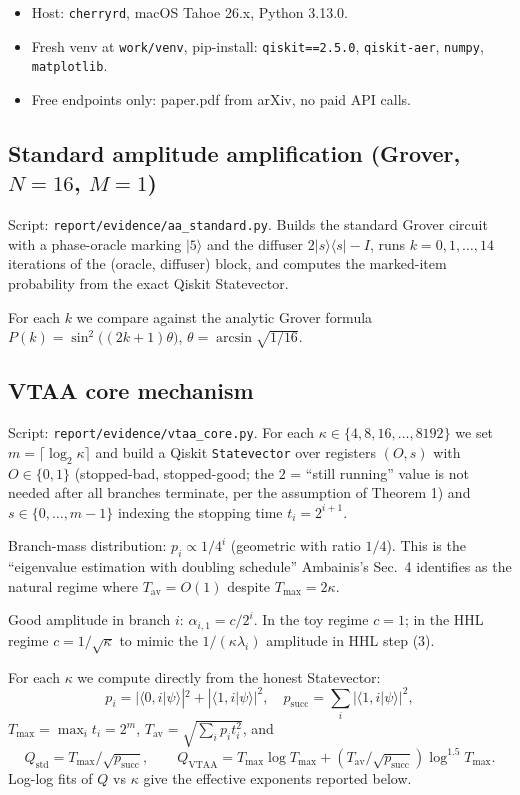 \documentclass[11pt]{article}
\begin{document}
\begin{itemize}
\item Host: \texttt{cherryrd}, macOS Tahoe 26.x, Python 3.13.0.
\item Fresh venv at \texttt{work/venv}, pip-install: \texttt{qiskit==2.5.0},
      \texttt{qiskit-aer}, \texttt{numpy}, \texttt{matplotlib}.
\item Free endpoints only: paper.pdf from arXiv, no paid API calls.
\end{itemize}

\subsection{Standard amplitude amplification (Grover, $N = 16$, $M = 1$)}

Script: \texttt{report/evidence/aa\_standard.py}. Builds the standard Grover
circuit with a phase-oracle marking $|5\rangle$ and the diffuser $2|s\rangle\langle s| - I$,
runs $k = 0, 1, \ldots, 14$ iterations of the (oracle, diffuser) block,
and computes the marked-item probability from the exact Qiskit Statevector.

For each $k$ we compare against the analytic Grover formula
$P(k) = \sin^2\!\bigl((2k+1)\theta\bigr)$, $\theta = \arcsin\sqrt{1/16}$.

\subsection{VTAA core mechanism}

Script: \texttt{report/evidence/vtaa\_core.py}. For each
$\kappa \in \{4, 8, 16, \ldots, 8192\}$ we set $m = \lceil\log_2\kappa\rceil$
and build a Qiskit \texttt{Statevector} over registers
$(O, s)$ with $O \in \{0, 1\}$ (stopped-bad, stopped-good; the $2$ = ``still
running'' value is not needed after all branches terminate, per the assumption
of Theorem 1) and $s \in \{0, \ldots, m-1\}$ indexing the stopping time
$t_i = 2^{i+1}$.

Branch-mass distribution: $p_i \propto 1/4^i$ (geometric with ratio $1/4$).
This is the ``eigenvalue estimation with doubling schedule'' Ambainis's Sec.~4
identifies as the natural regime where $T_{\mathrm{av}} = O(1)$ despite
$T_{\max} = 2\kappa$.

Good amplitude in branch $i$: $\alpha_{i,1} = c/2^i$. In the toy regime $c=1$;
in the HHL regime $c = 1/\sqrt{\kappa}$ to mimic the $1/(\kappa \lambda_i)$
amplitude in HHL step (3).

For each $\kappa$ we compute directly from the honest Statevector:
\[
p_i = |\langle 0, i | \psi \rangle|^2 + |\langle 1, i | \psi \rangle|^2, \quad
p_{\mathrm{succ}} = \sum_i |\langle 1, i | \psi \rangle|^2,
\]
$T_{\max} = \max_i t_i = 2^{m}$, $T_{\mathrm{av}} = \sqrt{\sum_i p_i t_i^2}$, and
\[
Q_{\mathrm{std}} = T_{\max}/\sqrt{p_{\mathrm{succ}}}, \qquad
Q_{\mathrm{VTAA}} = T_{\max}\log T_{\max}
                    + (T_{\mathrm{av}}/\sqrt{p_{\mathrm{succ}}})\log^{1.5} T_{\max}.
\]
Log-log fits of $Q$ vs $\kappa$ give the effective exponents reported below.
\end{document}
